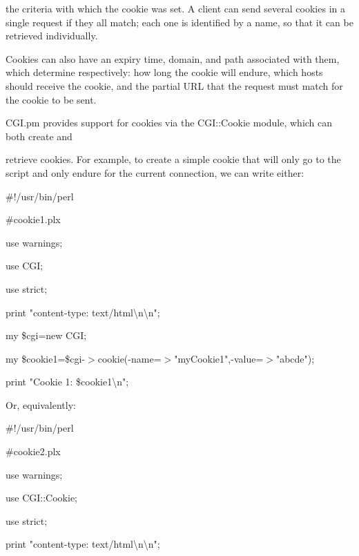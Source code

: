 \documentclass[a4paper,11pt]{book}
\begin{document}
\noindent the criteria with which the cookie was set. A client can send several cookies in a single request if they all match; each one is identified by a name, so that it can be retrieved individually.

\noindent 

\noindent Cookies can also have an expiry time, domain, and path associated with them, which determine respectively: how long the cookie will endure, which hosts should receive the cookie, and the partial URL that the request must match for the cookie to be sent.

\noindent 

\noindent CGI.pm provides support for cookies via the CGI::Cookie module, which can both create and

\noindent retrieve cookies. For example, to create a simple cookie that will only go to the script and only endure for the current connection, we can write either:

\noindent 

\noindent 

\noindent \#!/usr/bin/perl

\noindent \#cookie1.plx

\noindent use warnings;

\noindent use CGI;

\noindent use strict;

\noindent print "content-type: text/html\textbackslash n\textbackslash n";

\noindent 

\noindent my \$cgi=new CGI;

\noindent my \$cookie1=\$cgi-$>$cookie(-name=$>$"myCookie1",-value=$>$"abcde");

\noindent print "Cookie 1: \$cookie1\textbackslash n";

\noindent 

\noindent Or, equivalently:

\noindent 

\noindent 

\noindent \#!/usr/bin/perl

\noindent \#cookie2.plx

\noindent use warnings;

\noindent use CGI::Cookie;

\noindent use strict;

\noindent print "content-type: text/html\textbackslash n\textbackslash n";

\noindent 
\end{document}
